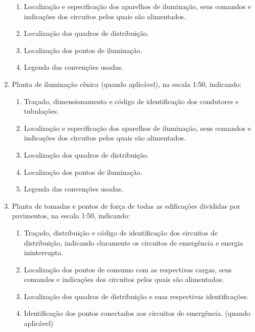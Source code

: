 \begin{enumerate}
\begin{enumerate}
			\item Localização e especificação dos aparelhos de iluminação, seus comandos e indicações dos circuitos pelos quais são alimentados.
			
			\item Localização dos quadros de distribuição.
			
			\item Localização dos pontos de iluminação.
			
			\item Legenda das convenções usadas.
		\end{enumerate}
	
		\item Planta de iluminação cênica (quando aplicável), na escala 1:50, indicando:
			\begin{enumerate}
				\item Traçado, dimensionamento e código de identificação dos condutores e tubulações.
			
				\item Localização e especificação dos aparelhos de iluminação, seus comandos e indicações dos circuitos pelos quais são alimentados.
			
				\item Localização dos quadros de distribuição.
			
				\item Localização dos pontos de iluminação.
			
				\item Legenda das convenções usadas.
			\end{enumerate}
		
		\item Planta de tomadas e pontos de força de todas as edificações divididas por pavimentos, na escala 1:50, indicando:
		\begin{enumerate}

			\item Traçado, distribuição e código de identificação dos circuitos de distribuição, indicando claramente os circuitos de emergência e energia ininterrupta.

			\item Localização dos pontos de consumo com as respectivas cargas, seus comandos e indicações dos circuitos pelos quais são alimentados.

			\item Localização dos quadros de distribuição e suas respectivas identificações.

			\item Identificação dos pontos conectados aos circuitos de emergência. (quando aplicável)
			

\end{enumerate}
\end{enumerate}
